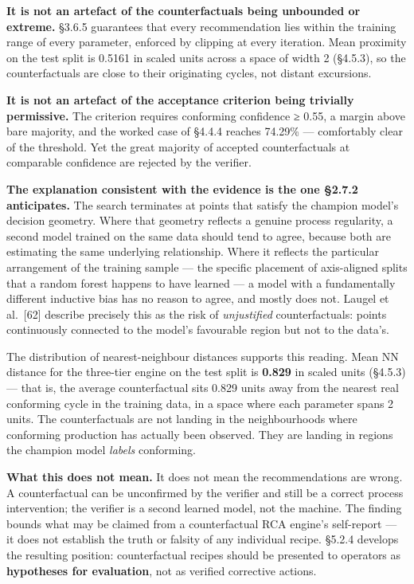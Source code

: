 \textbf{It is not an artefact of the counterfactuals being unbounded or extreme.} §3.6.5 guarantees that every recommendation lies within the training range of every parameter, enforced by clipping at every iteration. Mean proximity on the test split is 0.5161 in scaled units across a space of width 2 (§4.5.3), so the counterfactuals are close to their originating cycles, not distant excursions.

\textbf{It is not an artefact of the acceptance criterion being trivially permissive.} The criterion requires conforming confidence ≥ 0.55, a margin above bare majority, and the worked case of §4.4.4 reaches 74.29\% --- comfortably clear of the threshold. Yet the great majority of accepted counterfactuals at comparable confidence are rejected by the verifier.

\textbf{The explanation consistent with the evidence is the one §2.7.2 anticipates.} The search terminates at points that satisfy the champion model's decision geometry. Where that geometry reflects a genuine process regularity, a second model trained on the same data should tend to agree, because both are estimating the same underlying relationship. Where it reflects the particular arrangement of the training sample --- the specific placement of axis-aligned splits that a random forest happens to have learned --- a model with a fundamentally different inductive bias has no reason to agree, and mostly does not. Laugel et al.~{[}62{]} describe precisely this as the risk of \emph{unjustified} counterfactuals: points continuously connected to the model's favourable region but not to the data's.

The distribution of nearest-neighbour distances supports this reading. Mean NN distance for the three-tier engine on the test split is \textbf{0.829} in scaled units (§4.5.3) --- that is, the average counterfactual sits 0.829 units away from the nearest real conforming cycle in the training data, in a space where each parameter spans 2 units. The counterfactuals are not landing in the neighbourhoods where conforming production has actually been observed. They are landing in regions the champion model \emph{labels} conforming.

\textbf{What this does not mean.} It does not mean the recommendations are wrong. A counterfactual can be unconfirmed by the verifier and still be a correct process intervention; the verifier is a second learned model, not the machine. The finding bounds what may be claimed from a counterfactual RCA engine's self-report --- it does not establish the truth or falsity of any individual recipe. §5.2.4 develops the resulting position: counterfactual recipes should be presented to operators as \textbf{hypotheses for evaluation}, not as verified corrective actions.

